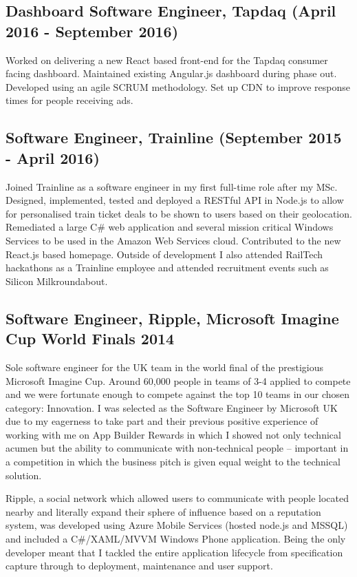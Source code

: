 \documentclass[10pt,letterpaper]{article}
\begin{document}
	\subsection*{Dashboard Software Engineer, Tapdaq \small{(April 2016 - September 2016)}}
	Worked on delivering a new React based front-end for the Tapdaq consumer facing dashboard. Maintained existing Angular.js dashboard during phase out. Developed using an agile SCRUM methodology. Set up CDN to improve response times for people receiving ads.
	
	\subsection*{Software Engineer, Trainline \small{(September 2015 - April 2016)}}
	Joined Trainline as a software engineer in my first full-time role after my MSc. Designed, implemented, tested and deployed a RESTful API in Node.js to allow for personalised train ticket deals to be shown to users based on their geolocation. Remediated a large C\# web application and several mission critical Windows Services to be used in the Amazon Web Services cloud. Contributed to the new React.js based homepage. Outside of development I also attended RailTech hackathons as a Trainline employee and attended recruitment events such as Silicon Milkroundabout.
	
	\subsection*{Software Engineer, Ripple, Microsoft Imagine Cup World Finals 2014}
	Sole software engineer for the UK team in the world final of the prestigious Microsoft Imagine Cup. Around 60,000 people in teams of 3-4 applied to compete and we were fortunate enough to compete against the top 10 teams in our chosen category: Innovation. I was selected as the Software Engineer by Microsoft UK due to my eagerness to take part and their previous positive experience of working with me on App Builder Rewards in which I showed not only technical acumen but the ability to communicate with non-technical people -- important in a competition in which the business pitch is given equal weight to the technical solution.

	Ripple, a social network which allowed users to communicate with people located nearby and literally expand their sphere of influence based on a reputation system, was developed using Azure Mobile Services (hosted node.js and MSSQL) and included a C\#/XAML/MVVM Windows Phone application. Being the only developer meant that I tackled the entire application lifecycle from specification capture through to deployment, maintenance and user support.
\end{document}
